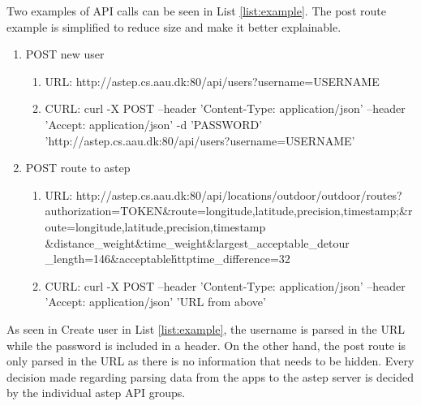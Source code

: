 Two examples of API calls can be seen in List \ref{list:example}.
The post route example is simplified to reduce size and make it better explainable.


\begin{enumerate}
\label{list:example}
\item POST new user
\begin{enumerate}
\item URL: http://astep.cs.aau.dk:80/api/users?username=USERNAME
\item CURL: curl -X POST --header 'Content-Type: application/json' --header\\
 'Accept: application/json' -d 'PASSWORD' 'http://astep.cs.aau.dk:80/api/users?username=USERNAME'
\end{enumerate}
\item POST route to \gls{astep}
\begin{enumerate}
\item URL: http://astep.cs.aau.dk:80/api/locations/outdoor/outdoor/routes?authorization=TOKEN\&route=longitude,latitude,precision,timestamp;\&route=longitude,latitude,precision,timestamp
\&distance\_weight\&time\_weight\&largest\_acceptable\_detour\\
\_length=146\&acceptable\'httptime\_difference=32
\item CURL: curl -X POST --header 'Content-Type: application/json' --header 'Accept: application/json' 'URL from above'
\end{enumerate}
\end{enumerate}

As seen in Create user in List \ref{list:example}, the username is parsed in the URL while the password is included in a header.
On the other hand, the post route is only parsed in the URL as there is no information that needs to be hidden.
Every decision made regarding parsing data from the apps to the \gls{astep} server is decided by the individual \gls{astep} API groups.
